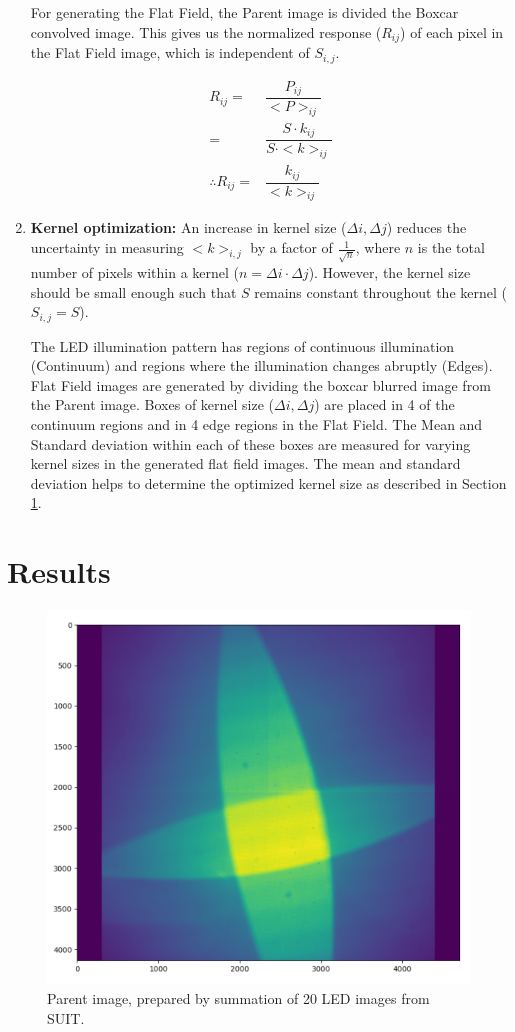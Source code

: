 \documentclass[11pt,a4paper]{article}
\begin{document}
\begin{enumerate}
	For generating the Flat Field, the Parent image is divided the Boxcar convolved image. This gives us the normalized response ($R_{ij}$) of each pixel in the Flat Field image, which is independent of $S_{i,j}$.
	
	\begin{align}
		R_{ij}=& \dfrac{P_{ij}}{<P>_{ij}} \\ 
		=&  \dfrac{S\cdot k_{ij}}{ S \cdot <k>_{ij}}\\
		\therefore R_{ij}=& \dfrac{k_{ij}}{<k>_{ij}}
	\end{align}

	\item \textbf{Kernel optimization:} An increase in kernel size ($\Delta i, \Delta j$) reduces the uncertainty in measuring $<k>_{i,j}$ by a factor of $\frac{1}{\sqrt n}$, where $ n $ is the total number of pixels within a kernel ($n= \Delta i \cdot \Delta j$). However, the kernel size should be small enough such that $S$ remains constant throughout the kernel ($S_{i,j}= S$).
	
	The LED illumination pattern has regions of continuous illumination (Continuum) and regions where the illumination changes abruptly (Edges). Flat Field images are generated by dividing the boxcar blurred image from the Parent image. Boxes of kernel size ($\Delta i, \Delta j$) are placed in 4 of the continuum regions and in 4 edge regions in the Flat Field. The Mean and Standard deviation within each of these boxes are measured for varying kernel sizes in the generated flat field images. The mean and standard deviation helps to determine the optimized kernel size as described in Section \ref{results}.
	\end{enumerate}

\section {Results}	\label{results}

	\begin{figure}
		\centering
		\includegraphics[width=0.3\linewidth]{pics/parent.png}
		\caption{Parent image, prepared by summation of 20 LED images from SUIT.}
		\label{fig:parent}
	\end{figure}
	
\end{document}
